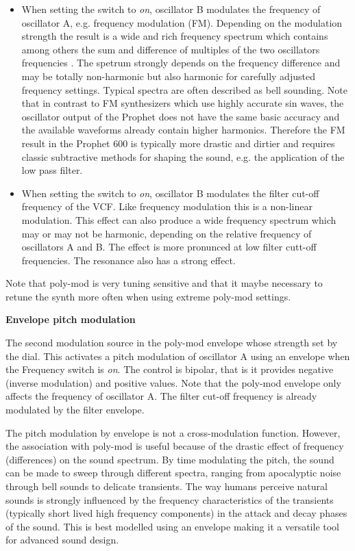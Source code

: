 \begin{itemize}
  \item When setting the \plyfreqa switch to \textit{on}, oscillator B modulates the frequency of oscillator A, e.g. frequency modulation (FM). Depending on the modulation strength the result is a wide and rich frequency spectrum which contains among others the sum and difference of multiples of the two oscillators frequencies . The spetrum strongly depends on the frequency difference and may be totally non-harmonic but also harmonic for carefully adjusted frequency settings. Typical spectra are often described as bell sounding. Note that in contrast to FM synthesizers which use highly accurate sin waves, the oscillator output of the Prophet does not have the same basic accuracy and the available waveforms already contain higher harmonics. Therefore the FM result in the Prophet 600 is typically more drastic and dirtier and requires classic subtractive methods for shaping the sound, e.g. the application of the low pass filter. 
  \item When setting the \plyfilter switch to \textit{on}, oscillator B modulates the filter cut-off frequency of the VCF. Like frequency modulation this is a non-linear modulation. This effect can also produce a wide frequency spectrum which may or may not be harmonic, depending on the relative frequency of oscillators A and B. The effect is more pronunced at low filter cutt-off frequencies. The resonance also has a strong effect.  
\end{itemize}

Note that poly-mod is very tuning sensitive and that it maybe necessary to retune the synth more often when using extreme poly-mod settings.

\textbf{Envelope pitch modulation}

The second modulation source in the poly-mod envelope whose strength set by the \polyenv dial. This activates a pitch modulation of oscillator A using an envelope when the Frequency switch is \textit{on}. The \polyenv control is bipolar, that is it provides negative (inverse modulation) and positive values. Note that the poly-mod envelope only affects the frequency of oscillator A. The filter cut-off frequency is already modulated by the filter envelope. 

The pitch modulation by envelope is not a cross-modulation function. However, the association with poly-mod is useful because of the drastic effect of frequency (differences) on the sound spectrum. By time modulating the pitch, the sound can be made to sweep through different spectra, ranging from apocalyptic noise through bell sounds to delicate transients. The way humans perceive natural sounds is strongly influenced by the frequency characteristics of the transients (typically short lived high frequency components) in the attack and decay phases of the sound. This is best modelled using an envelope making it a versatile tool for advanced sound design. 

